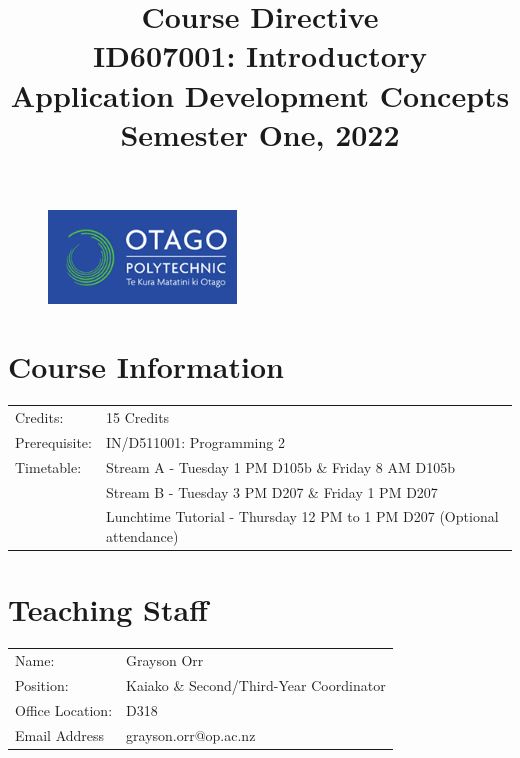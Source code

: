 \documentclass{article}
\author{}
\begin{document}
\begin{figure}
	\includegraphics[width=50mm]{../img/logo.png}
\end{figure}

\title{Course Directive\\ID607001: Introductory Application Development Concepts\\Semester One, 2022}
\date{}
\maketitle

\section*{Course Information}
\begin{tabular}{ll}
	Credits:      & 15 Credits                                                             \\
	Prerequisite: & IN/D511001: Programming 2                                                   \\
	Timetable:    & Stream A - Tuesday 1 PM D105b \& Friday 8 AM D105b                     \\
	              & Stream B - Tuesday 3 PM D207 \& Friday 1 PM D207                       \\
	              & Lunchtime Tutorial - Thursday 12 PM to 1 PM D207 (Optional attendance)
\end{tabular}

\section*{Teaching Staff}
\begin{tabular}{ll}
	Name:            & Grayson Orr                             \\
	Position:        & Kaiako \& Second/Third-Year Coordinator \\
	Office Location: & D318                                    \\
	Email Address    & grayson.orr@op.ac.nz                    \\
\end{tabular}
\end{document}
